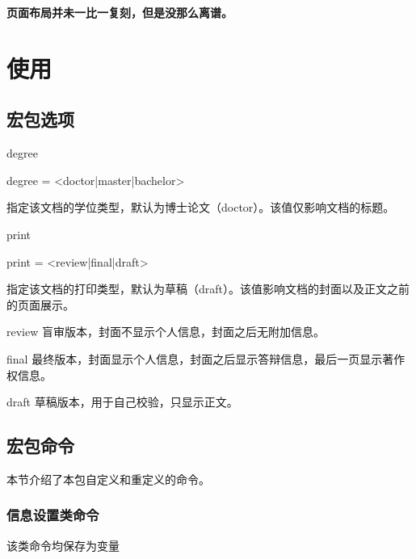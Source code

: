 \documentclass{ctxdoc}
\begin{document}
    \textbf{页面布局并未一比一复刻，但是没那么离谱。}


    \section{使用}
    \subsection{宏包选项}
    \begin{function}[added=2024-08-18]{degree}
        \begin{syntax}
            degree = <doctor|master|bachelor>
        \end{syntax}
        指定该文档的学位类型，默认为博士论文（doctor）。该值仅影响文档的标题。
    \end{function}
    \begin{function}[added=2024-08-18]{print}
        \begin{syntax}
            print = <review|final|draft>
        \end{syntax}
        指定该文档的打印类型，默认为草稿（draft）。该值影响文档的封面以及正文之前的页面展示。
    \end{function}

    \begin{optdesc}
        \item[review] 盲审版本，封面不显示个人信息，封面之后无附加信息。
        \item[final] 最终版本，封面显示个人信息，封面之后显示答辩信息，最后一页显示著作权信息。
        \item[draft] 草稿版本，用于自己校验，只显示正文。
    \end{optdesc}

    \subsection{宏包命令}

    本节介绍了本包自定义和重定义的命令。

    \subsubsection{信息设置类命令}
    该类命令均保存为变量

\end{document}
